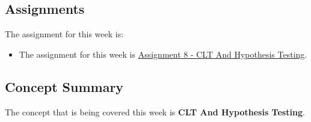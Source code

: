 \subsection{Assignments}

The assignment for this week is:

\begin{itemize}
    \item The assignment for this week is \href{https://github.com/QuantumCompiler/CU/tree/main/CSPB%203022%20-%20Introduction%20To%20Data%20Science%20With%20Probability%20And%20Statistics/CSPB%203022%20-%20Assignments/CSPB%203022%20-%20Assignment%208%20-%20CLT%20And%20Hypothesis%20Testing}{Assignment 8 - CLT And Hypothesis Testing}. 
\end{itemize}

\subsection{Concept Summary}

The concept that is being covered this week is \textbf{CLT And Hypothesis Testing}.

